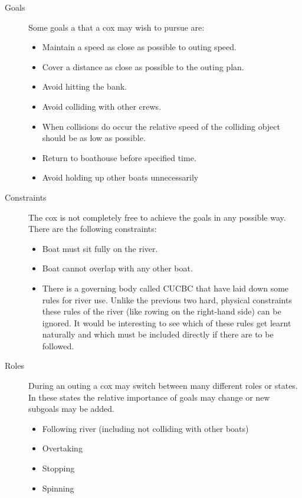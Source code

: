 \begin{description}
  \item[Goals]
    Some goals a that a cox may wish to pursue are:
    \begin{itemize}
      \item Maintain a speed as close as possible to outing speed.
      \item Cover a distance as close as possible to the outing plan.
      \item Avoid hitting the bank.
      \item Avoid colliding with other crews.
      \item When collisions do occur the relative speed of the colliding object should be as low as possible.
      \item Return to boathouse before specified time.
      \item Avoid holding up other boats unnecessarily
    \end{itemize}
    
  \item[Constraints] The cox is not completely free to achieve the
    goals in any possible way. There are the following constraints:
    \begin{itemize}
      \item Boat must sit fully on the river.
      \item Boat cannot overlap with any other boat.
      \item There is a governing body called CUCBC that have laid down some rules for river use. Unlike the previous two hard, physical constraints these rules of the river (like rowing on the right-hand side) can be ignored. It would be interesting to see which of these rules get learnt naturally and which must be included directly if there are to be followed.
    \end{itemize}
    
  \item[Roles]
    During an outing a cox may switch between many different roles or states. In these states the relative importance of goals may change or new subgoals may be added.
    \begin{itemize}
      \item Following river (including not colliding with other boats)
      \item Overtaking
      \item Stopping
      \item Spinning
    \end{itemize}
  \end{description}
  
